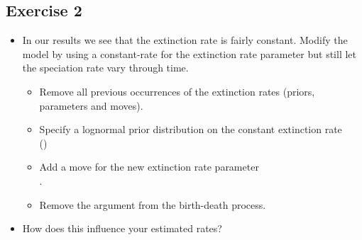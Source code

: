 \subsection{Exercise 2}

\begin{itemize}
\item In our results we see that the extinction rate is fairly constant. Modify the model by using a constant-rate for the extinction rate parameter but still let the speciation rate vary through time. 
\begin{itemize}
\item Remove all previous occurrences of the extinction rates (\IE priors, parameters and moves).
\item Specify a lognormal prior distribution on the constant extinction rate \\()
\item Add a move for the new extinction rate parameter \\.
\item Remove the argument  from the birth-death process.
\end{itemize}
\item How does this influence your estimated rates?
\end{itemize}





